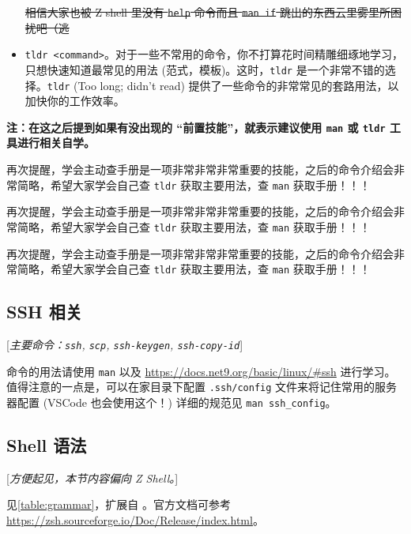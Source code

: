 \documentclass{article}
\begin{document}
\begin{itemize}
			\normalcolor\sout{相信大家也被 Z shell 里没有 \texttt{help} 命令而且 \texttt{man if} 跳出的东西云里雾里所困扰吧（逃}
		\item \texttt{tldr <command>}。对于一些不常用的命令，你不打算花时间精雕细琢地学习，只想快速知道最常见的用法 (范式，模板)。这时，\texttt{tldr} 是一个非常不错的选择。\texttt{tldr} (Too long; didn't read) 提供了一些命令的非常常见的套路用法，以加快你的工作效率。
	\end{itemize}

	{\color{red}\bfseries 注：在这之后提到如果有没出现的 ``前置技能''，就表示建议使用 \texttt{man} 或 \texttt{tldr} 工具进行相关自学。\par
	再次提醒，学会主动查手册是一项非常非常非常重要的技能，之后的命令介绍会非常简略，希望大家学会自己查 \texttt{tldr} 获取主要用法，查 \texttt{man} 获取手册！！！\par
	再次提醒，学会主动查手册是一项非常非常非常重要的技能，之后的命令介绍会非常简略，希望大家学会自己查 \texttt{tldr} 获取主要用法，查 \texttt{man} 获取手册！！！\par
	再次提醒，学会主动查手册是一项非常非常非常重要的技能，之后的命令介绍会非常简略，希望大家学会自己查 \texttt{tldr} 获取主要用法，查 \texttt{man} 获取手册！！！}

	\subsection{SSH 相关}

	\textcolor{properpurple}{[\textit{主要命令：\texttt{ssh}, \texttt{scp}, \texttt{ssh-keygen}, \texttt{ssh-copy-id}}]}

	命令的用法请使用 \texttt{man} 以及 \url{https://docs.net9.org/basic/linux/#ssh} 进行学习。值得注意的一点是，可以在家目录下配置 \texttt{.ssh/config} 文件来将记住常用的服务器配置 (VSCode 也会使用这个！) 详细的规范见 \verb!man ssh_config!。

	\subsection{Shell 语法}
	\label{sss:shell-syntax}

	\textcolor{properpurple}{[\textit{方便起见，本节内容偏向 Z Shell。}]}

	见\autoref{table:grammar}，扩展自 \cite{lbwvssl}。官方文档可参考 \url{https://zsh.sourceforge.io/Doc/Release/index.html}。
\end{document}
